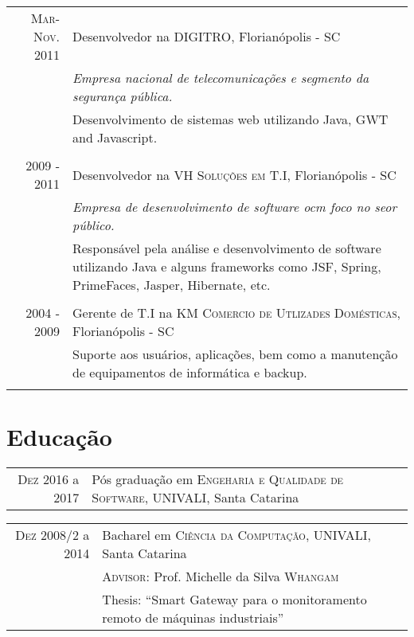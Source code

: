 \documentclass[a4paper,10pt]{article}
\begin{document}
\begin{tabular}{r|p{11cm}}
\textsc{Mar-Nov. 2011} & Desenvolvedor na \textsc{DIGITRO}, Florianópolis - SC \\ &\emph{Empresa nacional de telecomunicações e segmento da segurança pública.}\\&\footnotesize{Desenvolvimento de sistemas web utilizando Java, GWT and Javascript.} \\\multicolumn{2}{c}{} \\

\textsc{2009 - 2011} & Desenvolvedor na \textsc{VH Soluções em T.I}, Florianópolis - SC \\ &\emph{Empresa de desenvolvimento de software ocm foco no seor público.}\\&\footnotesize{Responsável pela análise e desenvolvimento de software utilizando Java e alguns frameworks como JSF, Spring, PrimeFaces, Jasper, Hibernate, etc.}\\\multicolumn{2}{c}{} \\

\textsc{2004 - 2009} & Gerente de T.I na \textsc{KM Comercio de Utlizades Domésticas}, Florianópolis - SC \\&\footnotesize{Suporte aos usuários, aplicações, bem como a manutenção de equipamentos de informática e backup.}\\\multicolumn{2}{c}{} \\ 

\end{tabular}

\section{Educação}

\begin{tabular}{rl}	

\textsc{Dez} 2016 a 2017 & Pós graduação em \textsc{Engeharia e Qualidade de Software}, UNIVALI, Santa Catarina\\
\end{tabular}

\begin{tabular}{rl}	
\textsc{Dez} 2008/2 a 2014 & Bacharel em \textsc{Ciência da Computação}, UNIVALI, Santa Catarina\\
&\normalsize \textsc{Advisor}: Prof. Michelle da Silva \textsc{Whangam}\\
& Thesis: ``Smart Gateway para o monitoramento remoto de máquinas industriais''
\end{tabular}
\end{document}
